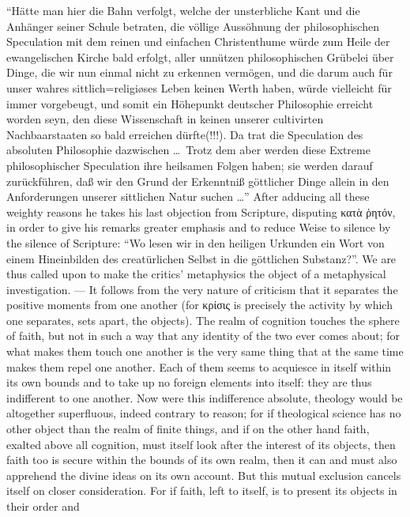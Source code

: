 \documentclass[12pt]{book}
\newcommand{\opage}[1]{\marginnote{\footnotesize\textit{[#1]}}}
\begin{document}
{``Hätte man hier die Bahn verfolgt, welche der unsterbliche Kant und die
Anhänger seiner Schule betraten, die völlige Aussöhnung der philosophischen
Speculation mit dem reinen und einfachen Christenthume würde zum Heile der
ewangelischen Kirche bald erfolgt, aller unnützen philosophischen Grübelei
über Dinge, die wir nun einmal nicht zu erkennen vermögen, und die darum auch
für unser wahres sittlich=religiøses Leben keinen Werth haben, würde
vielleicht für immer vorgebeugt, und somit ein Höhepunkt deutscher
Philosophie erreicht worden seyn, den diese Wissenschaft in keinen unserer
cultivirten Nachbaarstaaten so bald erreichen dürfte(!!!). Da trat die
Speculation des absoluten Philosophie dazwischen \ldots\ Trotz dem aber werden
diese Extreme philosophischer Speculation ihre heilsamen Folgen haben; sie
werden darauf zurückführen, daß wir den Grund der Erkenntniß göttlicher Dinge
allein in den Anforderungen unserer sittlichen Natur suchen \ldots'' After
adducing all these weighty reasons he takes his last objection from
Scripture, disputing κατὰ ῥητόν, in order to give his remarks greater
emphasis and to reduce Weise to silence by the silence of Scripture: ``Wo
lesen wir in den heiligen Urkunden ein Wort von einem Hineinbilden des
creatürlichen Selbst in die göttlichen Substanz?''}.
\opage{121} %
We are thus called upon to make the critics' metaphysics the object of a
metaphysical investigation. --- It follows
\opage{122} from the very nature of criticism that it separates the positive moments from
one another (for κρίσις is precisely the activity by which one separates,
sets apart, the objects). The realm of cognition touches the sphere of faith,
but not in such a way that any identity of the two ever comes about; for what
makes them touch one another is the very same thing that at the same time makes
them repel one another. Each of them seems to acquiesce in itself within its
own bounds and to take up no foreign elements into itself: they are thus
indifferent to one another. Now were this indifference absolute, theology
would be altogether superfluous, indeed contrary to reason; for if theological
science has no other object than the realm of finite things, and if on the
other hand faith, exalted above all cognition, must itself look after the
interest of its objects, then faith too is secure within the bounds of its
own realm, then it can and must also apprehend the divine ideas on its own
account. But this mutual exclusion cancels itself on closer consideration.
For if faith, left to itself, is to present its objects in their order and
\end{document}
